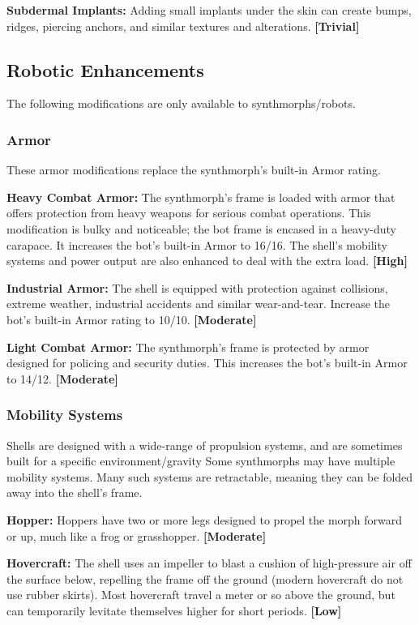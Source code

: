 \textbf{Subdermal Implants:} Adding small implants under 
the skin can create bumps, ridges, piercing anchors, 
and similar textures and alterations. \textbf{[Trivial]}

\subsection{Robotic Enhancements}

The following modifications are only available to 
synthmorphs/robots.

\subsubsection{Armor}

These armor modifications replace the synthmorph's 
built-in Armor rating.

\textbf{Heavy Combat Armor:} The synthmorph's frame is 
loaded with armor that offers protection from heavy 
weapons for serious combat operations. This modification
is bulky and noticeable; the bot frame is encased
in a heavy-duty carapace. It increases the bot's
built-in Armor to 16/16. The shell's mobility systems 
and power output are also enhanced to deal with the 
extra load. \textbf{[High]}

\textbf{Industrial Armor:} The shell is equipped with protection
against collisions, extreme weather, industrial accidents
and similar wear-and-tear. Increase the bot's
built-in Armor rating to 10/10. \textbf{[Moderate]}

\textbf{Light Combat Armor:} The synthmorph's frame is 
protected by armor designed for policing and security
duties. This increases the bot's built-in Armor to
14/12. \textbf{[Moderate]}

\subsubsection{Mobility Systems}

Shells are designed with a wide-range of propulsion 
systems, and are sometimes built for a specific environment/gravity
Some synthmorphs may have multiple
mobility systems. Many such systems are retractable, 
meaning they can be folded away into the shell's frame.

\textbf{Hopper:} Hoppers have two or more legs designed 
to propel the morph forward or up, much like a frog 
or grasshopper. \textbf{[Moderate]}

\textbf{Hovercraft:} The shell uses an impeller to blast a 
cushion of high-pressure air off the surface below, 
repelling the frame off the ground (modern hovercraft 
do not use rubber skirts). Most hovercraft travel a 
meter or so above the ground, but can temporarily 
levitate themselves higher for short periods. \textbf{[Low]}


